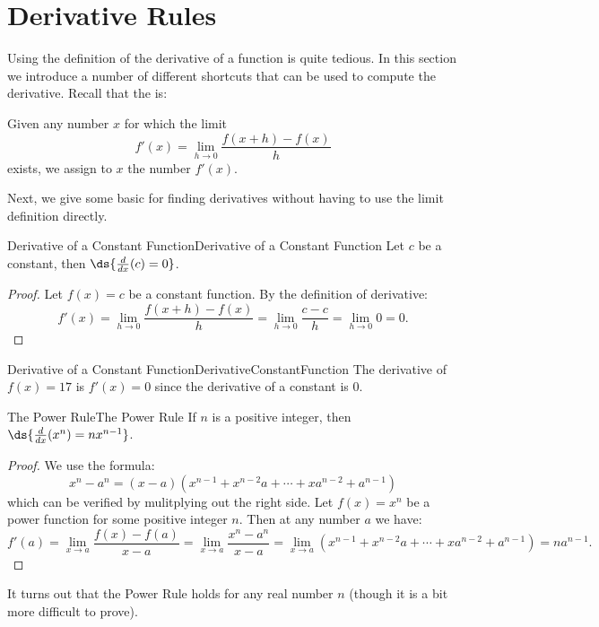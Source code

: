 \section{Derivative Rules}\label{sec:DerivativeRules}
Using the definition of the derivative of a function is quite tedious.
In this section we introduce a number of different shortcuts that can be used to compute the derivative.
Recall that the  is:

Given any number $x$ for which the limit 
$$f'(x)=\lim_{h\to 0}\frac{f(x+h)-f(x)}{h}$$
exists, we assign to $x$ the number $f'(x)$.

Next, we give some basic  for finding derivatives without having to use the limit definition directly.

\begin{theorem}{Derivative of a Constant Function}{Derivative of a Constant Function}
Let $c$ be a constant, then $\ds{\frac{d}{dx}(c)=0}$.
\end{theorem}

\begin{proof}
Let $f(x)=c$ be a constant function. By the definition of derivative:
$$f'(x)=\lim_{h\to 0}\frac{f(x+h)-f(x)}{h}=\lim_{h\to 0}\frac{c-c}{h}=\lim_{h\to 0}0=0.$$
\end{proof}

\begin{example}{Derivative of a Constant Function}{DerivativeConstantFunction}
 The derivative of $f(x)=17$ is $f'(x)=0$ since the derivative of a constant is $0$.
\end{example}

\begin{theorem}{The Power Rule}{The Power Rule}
If $n$ is a positive integer, then $\ds{\frac{d}{dx}(x^n)=nx^{n-1}}$.
\end{theorem}

\begin{proof}
We use the formula:
$$x^n-a^n=(x-a)(x^{n-1}+x^{n-2}a+\cdots+xa^{n-2}+a^{n-1})$$
which can be verified by mulitplying out the right side.
Let $f(x)=x^n$ be a power function for some positive integer $n$.
Then at any number $a$ we have:
$$f'(a)=\lim_{x\to a}\frac{f(x)-f(a)}{x-a}=\lim_{x\to a}\frac{x^n-a^n}{x-a}=\lim_{x\to a}(x^{n-1}+x^{n-2}a+\cdots+xa^{n-2}+a^{n-1})=na^{n-1}.$$
\end{proof}

It turns out that the Power Rule holds for any real number $n$ (though it is a bit more difficult to prove).

